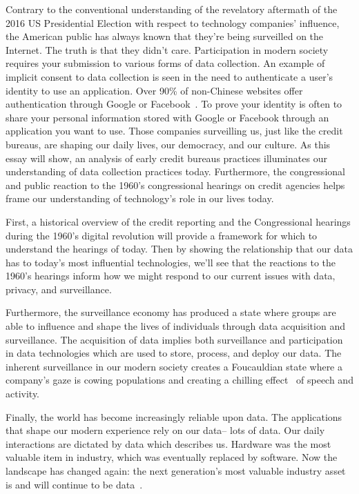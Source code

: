 Contrary to the conventional understanding of the revelatory aftermath of the
2016 US Presidential Election with respect to technology companies' influence,
the American public has always known that they're being surveilled on the
Internet. The truth is that they didn't care. Participation in modern society
requires your submission to various forms of data collection. An example of
implicit consent to data collection is seen in the need to authenticate a user's
identity to use an application. Over 90\% of non-Chinese websites offer
authentication through Google or Facebook~\cite{identity2018economist}. To prove
your identity is often to share your personal information stored with Google or
Facebook through an application you want to use. Those companies surveilling us,
just like the credit bureaus, are shaping our daily lives, our democracy, and
our culture. As this essay will show, an analysis of early
credit bureaus practices illuminates our understanding of data collection practices today.
Furthermore, the congressional and public reaction to the 1960's congressional
hearings on credit agencies helps frame our understanding of technology's role
in our lives today.

First, a historical overview of the credit reporting and the Congressional
hearings during the 1960's digital revolution will provide a framework for
which to understand the hearings of today. Then by showing the relationship
that our data has to today's most influential technologies, we'll see that the
reactions to the 1960's hearings inform how we might respond to our current
issues with data, privacy, and surveillance.

Furthermore, the surveillance economy has produced a state where groups are
able to influence and shape the lives of individuals through data acquisition
and surveillance. The acquisition of data implies both surveillance and participation in data
technologies which are used to store, process, and deploy our data. The inherent
surveillance in our modern society creates a Foucauldian state where a company's gaze is cowing
populations and creating a chilling effect~\cite{richards2012dangers} of speech and activity.

Finally, the world has become increasingly reliable upon data. The applications that
shape our modern experience rely on our data-- lots of data. Our daily
interactions are dictated by data which describes us. Hardware was the most
valuable item in industry, which was eventually replaced by software. Now the
landscape has changed again: the next generation's most valuable industry asset
is and will continue to be data~\cite{janeway2018doing}.

